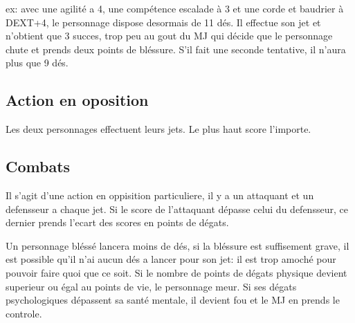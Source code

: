 ex: avec une agilité a 4, une compétence escalade à 3 et une corde et baudrier à DEXT+4, le personnage dispose desormais de 11 dés. Il effectue son jet et n'obtient que 3 succes, trop peu au gout du MJ qui décide que le personnage chute et prends deux points de bléssure. S'il fait une seconde tentative, il n'aura plus que 9 dés.

\subsection{Action en oposition}
Les deux personnages effectuent leurs jets. Le plus haut score l'importe.

\subsection{Combats}
Il s'agit d'une action en oppisition particuliere, il y a un attaquant et un defensseur a chaque jet. Si le score de l'attaquant dépasse celui du defensseur, ce dernier prends l'ecart des scores en points de dégats.

Un personnage bléssé lancera moins de dés, si la bléssure est suffisement grave, il est possible qu'il n'ai aucun dés a lancer pour son jet: il est trop amoché pour pouvoir faire quoi que ce soit. Si le nombre de points de dégats physique devient superieur ou égal au points de vie, le personnage meur. Si ses dégats psychologiques dépassent sa santé mentale, il devient fou et le MJ en prends le controle.

